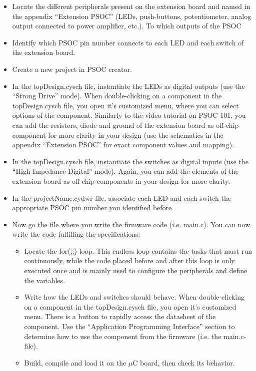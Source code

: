 \documentclass[11pt,a4paper]{article}
\theoremstyle{definition}%
\begin{document}
\begin{itemize}
	\item Locate the different peripherals present on the extension board and named in the appendix ``Extension PSOC'' (LEDs, push-buttons, potentiometer, analog output connected to power amplifier, etc.). To which outputs of the PSOC 
	\item Identify which PSOC pin number connects to each LED and each switch of the extension board. 
	\item Create a new project in PSOC creator. 
	\item In the topDesign.cysch file, instantiate the LEDs as digital outputs (use the ``Strong Drive'' mode). When double-clicking on a component in the topDesign.cysch file, you open it's customized menu, where you can select options of the component. Similarly to the video tutorial on PSOC 101, you can add the resistors, diode and ground of the extension board as off-chip component for more clarity in your design (use the schematics in the appendix ``Extension PSOC'' for exact component values and mapping). 
	\item In the topDesign.cysch file, instantiate the switches as digital inputs (use the ``High Impedance Digital'' mode). Again, you can add the elements of the extension board as off-chip components in your design for more clarity. 
	\item In the projectName.cydwr file, associate each LED and each switch the appropriate PSOC pin number you identified before. 
	
	\item Now go the file where you write the firmware code (i.e. main.c). You can now write the code fulfilling the specifications: 
	\begin{itemize}
		\item Locate the for(;;) loop.
        This endless loop contains the tasks that must run continuously, while the code placed before and after this loop is only executed once and is mainly used to configure the peripherals and define the variables.
		\item Write how the LEDs and switches should behave. When double-clicking on a component in the topDesign.cysch file, you open it's customized menu. There is a button to rapidly access the datasheet of the component. Use the ``Application Programming Interface'' section to determine how to use the component from the firmware (i.e. the main.c-file). 
		\item Build, compile and load it on the $\mu$C board, then check its behavior.
	\end{itemize}
\end{itemize}
\end{document}
